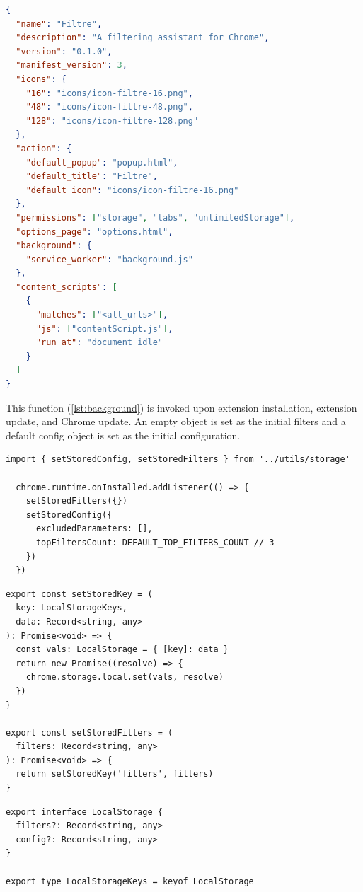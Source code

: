 \begin{lstlisting}[language=json, caption={Manifest File (JSON)}, label={lst:manifest}]
{
  "name": "Filtre",
  "description": "A filtering assistant for Chrome",
  "version": "0.1.0",
  "manifest_version": 3,
  "icons": {
    "16": "icons/icon-filtre-16.png",
    "48": "icons/icon-filtre-48.png",
    "128": "icons/icon-filtre-128.png"
  },
  "action": {
    "default_popup": "popup.html",
    "default_title": "Filtre",
    "default_icon": "icons/icon-filtre-16.png"
  },
  "permissions": ["storage", "tabs", "unlimitedStorage"],
  "options_page": "options.html",
  "background": {
    "service_worker": "background.js"
  },
  "content_scripts": [
    {
      "matches": ["<all_urls>"],
      "js": ["contentScript.js"],
      "run_at": "document_idle"
    }
  ]
}
\end{lstlisting}

This function (\autoref{lst:background}) is invoked upon extension installation, extension update, and Chrome update. An empty object is set as the initial filters and a default config object is set as the initial configuration.

\begin{lstlisting}[style=ES6, caption={On install functions (TypeScript)}, label={lst:background}]
  import { setStoredConfig, setStoredFilters } from '../utils/storage'

  chrome.runtime.onInstalled.addListener(() => {
    setStoredFilters({})
    setStoredConfig({
      excludedParameters: [],
      topFiltersCount: DEFAULT_TOP_FILTERS_COUNT // 3
    })
  })
\end{lstlisting}

\begin{lstlisting}[style=ES6, caption={Helper functions for Chrome Storage API (TypeScript)}]
export const setStoredKey = (
  key: LocalStorageKeys,
  data: Record<string, any>
): Promise<void> => {
  const vals: LocalStorage = { [key]: data }
  return new Promise((resolve) => {
    chrome.storage.local.set(vals, resolve)
  })
}

export const setStoredFilters = (
  filters: Record<string, any>
): Promise<void> => {
  return setStoredKey('filters', filters)
}
\end{lstlisting}

\begin{lstlisting}[style=ES6, caption={TypeScript interface of a LocalStorage object (TypeScript)}]
export interface LocalStorage {
  filters?: Record<string, any>
  config?: Record<string, any>
}

export type LocalStorageKeys = keyof LocalStorage
\end{lstlisting}

